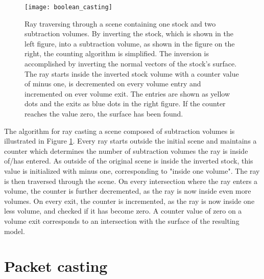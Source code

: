 \begin{figure}[h]
\centering
\texttt{[image: boolean\_casting]}
\caption[Boolean ray casting]{Ray traversing through a scene containing one stock and two subtraction volumes. By inverting the stock, which is shown in the left figure, into a subtraction volume, as shown in the figure on the right, the counting algorithm is simplified. The inversion is accomplished by inverting the normal vectors of the stock's surface. The ray starts inside the inverted stock volume with a counter value of minus one, is decremented on every volume entry and incremented on ever volume exit. The entries are shown as yellow dots and the exits as blue dots in the right figure. If the counter reaches the value zero, the surface has been found.}
\label{fig:boolean_casting} 
\end{figure}

The algorithm for ray casting a scene composed of subtraction volumes is illustrated in Figure \ref{fig:boolean_casting}. Every ray starts outside the initial scene and maintains a counter which determines the number of subtraction volumes the ray is inside of/has entered. As outside of the original scene is inside the inverted stock, this value is initialized with minus one, corresponding to "inside one volume". The ray is then traversed through the scene. On every intersection where the ray enters a volume, the counter is further decremented, as the ray is now inside even more volumes. On every exit, the counter is incremented, as the ray is now inside one less volume, and checked if it has become zero. A counter value of zero on a volume exit corresponds to an intersection with the surface of the resulting model.

\section{Packet casting}
\label{sec:packet_casting}

